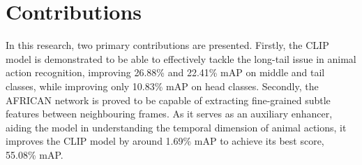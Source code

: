 \section{Contributions}
In this research, two primary contributions are presented. Firstly, the CLIP model is demonstrated to be able to effectively tackle the long-tail issue in animal action recognition, improving 26.88\% and 22.41\% mAP on middle and tail classes, while improving only 10.83\% mAP on head classes. Secondly, the AFRICAN network is proved to be capable of extracting fine-grained subtle features between neighbouring frames. As it serves as an auxiliary enhancer, aiding the model in understanding the temporal dimension of animal actions, it improves the CLIP model by around 1.69\% mAP to achieve its best score, 55.08\% mAP.

